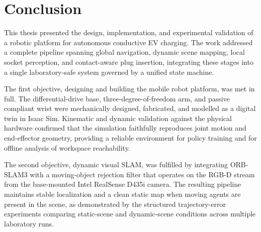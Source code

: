 \documentclass[10pt]{article}
\begin{document}


















\clearpage
\section{Conclusion}

This thesis presented the design, implementation, and experimental validation of a robotic platform for autonomous conductive EV charging. The work addressed a complete pipeline spanning global navigation, dynamic scene mapping, local socket perception, and contact-aware plug insertion, integrating these stages into a single laboratory-safe system governed by a unified state machine.

The first objective, designing and building the mobile robot platform, was met in full. The differential-drive base, three-degree-of-freedom arm, and passive compliant wrist were mechanically designed, fabricated, and modelled as a digital twin in Isaac Sim. Kinematic and dynamic validation against the physical hardware confirmed that the simulation faithfully reproduces joint motion and end-effector geometry, providing a reliable environment for policy training and for offline analysis of workspace reachability.

The second objective, dynamic visual SLAM, was fulfilled by integrating ORB-SLAM3 with a moving-object rejection filter that operates on the RGB-D stream from the base-mounted Intel RealSense D435i camera. The resulting pipeline maintains stable localization and a clean static map when moving agents are present in the scene, as demonstrated by the structured trajectory-error experiments comparing static-scene and dynamic-scene conditions across multiple laboratory runs.
\end{document}
